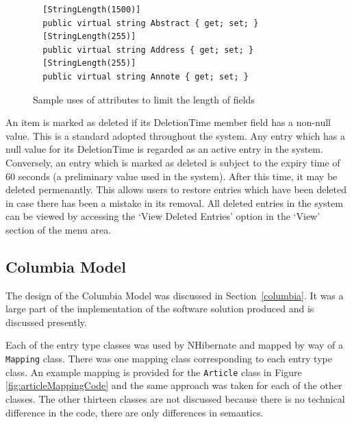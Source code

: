 \begin{figure}
	\begin{center}
			\lstset{language=CSharp} 
			\begin{lstlisting}
  [StringLength(1500)]
  public virtual string Abstract { get; set; }
  [StringLength(255)]
  public virtual string Address { get; set; }
  [StringLength(255)]
  public virtual string Annote { get; set; }				
			\end{lstlisting}
		\caption{Sample uses of attributes to limit the length of fields}
		\label{fig:fieldLen}
	\end{center}
\end{figure}

An item is marked as deleted if its DeletionTime member field has a non-null value.  This is a standard adopted throughout the system.  Any entry which has a null value for its DeletionTime is regarded as an active entry in the system.  Conversely, an entry which is marked as deleted is subject to the expiry time of 60 seconds (a preliminary value used in the system).  After this time, it may be deleted permenantly.  This allows users to restore entries which have been deleted in case there has been a mistake in its removal.  All deleted entries in the system can be viewed by accessing the `View Deleted Entries' option in the `View' section of the menu area.

\subsection{Columbia Model}
The design of the Columbia Model was discussed in Section~\ref{columbia}.  It was a large part of the implementation of the software solution produced and is discussed presently.

Each of the entry type classes was used by NHibernate and mapped by way of a \texttt{Mapping} class.  There was one mapping class corresponding to each entry type class.  An example mapping is provided for the \texttt{Article} class in Figure \ref{fig:articleMappingCode} and the same approach was taken for each of the other classes.  The other thirteen classes are not discussed because there is no technical difference in the code, there are only differences in semantics.

